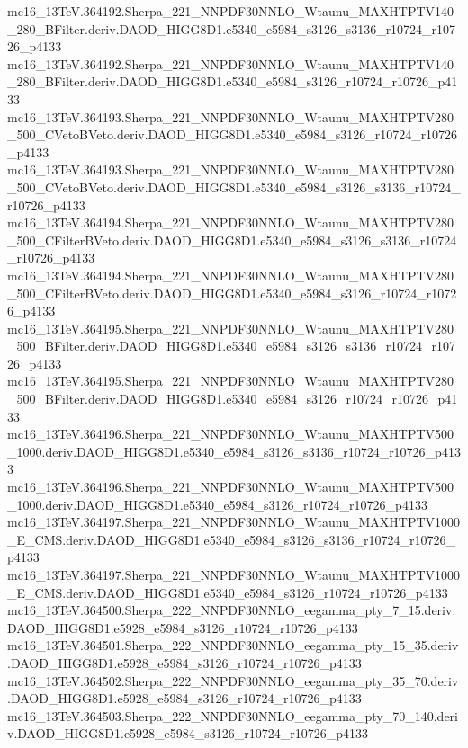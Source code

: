 mc16_13TeV.364192.Sherpa_221_NNPDF30NNLO_Wtaunu_MAXHTPTV140_280_BFilter.deriv.DAOD_HIGG8D1.e5340_e5984_s3126_s3136_r10724_r10726_p4133 \\
mc16_13TeV.364192.Sherpa_221_NNPDF30NNLO_Wtaunu_MAXHTPTV140_280_BFilter.deriv.DAOD_HIGG8D1.e5340_e5984_s3126_r10724_r10726_p4133 \\
mc16_13TeV.364193.Sherpa_221_NNPDF30NNLO_Wtaunu_MAXHTPTV280_500_CVetoBVeto.deriv.DAOD_HIGG8D1.e5340_e5984_s3126_r10724_r10726_p4133 \\
mc16_13TeV.364193.Sherpa_221_NNPDF30NNLO_Wtaunu_MAXHTPTV280_500_CVetoBVeto.deriv.DAOD_HIGG8D1.e5340_e5984_s3126_s3136_r10724_r10726_p4133 \\
mc16_13TeV.364194.Sherpa_221_NNPDF30NNLO_Wtaunu_MAXHTPTV280_500_CFilterBVeto.deriv.DAOD_HIGG8D1.e5340_e5984_s3126_s3136_r10724_r10726_p4133 \\
mc16_13TeV.364194.Sherpa_221_NNPDF30NNLO_Wtaunu_MAXHTPTV280_500_CFilterBVeto.deriv.DAOD_HIGG8D1.e5340_e5984_s3126_r10724_r10726_p4133 \\
mc16_13TeV.364195.Sherpa_221_NNPDF30NNLO_Wtaunu_MAXHTPTV280_500_BFilter.deriv.DAOD_HIGG8D1.e5340_e5984_s3126_s3136_r10724_r10726_p4133 \\
mc16_13TeV.364195.Sherpa_221_NNPDF30NNLO_Wtaunu_MAXHTPTV280_500_BFilter.deriv.DAOD_HIGG8D1.e5340_e5984_s3126_r10724_r10726_p4133 \\
mc16_13TeV.364196.Sherpa_221_NNPDF30NNLO_Wtaunu_MAXHTPTV500_1000.deriv.DAOD_HIGG8D1.e5340_e5984_s3126_s3136_r10724_r10726_p4133 \\
mc16_13TeV.364196.Sherpa_221_NNPDF30NNLO_Wtaunu_MAXHTPTV500_1000.deriv.DAOD_HIGG8D1.e5340_e5984_s3126_r10724_r10726_p4133 \\
mc16_13TeV.364197.Sherpa_221_NNPDF30NNLO_Wtaunu_MAXHTPTV1000_E_CMS.deriv.DAOD_HIGG8D1.e5340_e5984_s3126_s3136_r10724_r10726_p4133 \\
mc16_13TeV.364197.Sherpa_221_NNPDF30NNLO_Wtaunu_MAXHTPTV1000_E_CMS.deriv.DAOD_HIGG8D1.e5340_e5984_s3126_r10724_r10726_p4133 \\
mc16_13TeV.364500.Sherpa_222_NNPDF30NNLO_eegamma_pty_7_15.deriv.DAOD_HIGG8D1.e5928_e5984_s3126_r10724_r10726_p4133 \\
mc16_13TeV.364501.Sherpa_222_NNPDF30NNLO_eegamma_pty_15_35.deriv.DAOD_HIGG8D1.e5928_e5984_s3126_r10724_r10726_p4133 \\
mc16_13TeV.364502.Sherpa_222_NNPDF30NNLO_eegamma_pty_35_70.deriv.DAOD_HIGG8D1.e5928_e5984_s3126_r10724_r10726_p4133 \\
mc16_13TeV.364503.Sherpa_222_NNPDF30NNLO_eegamma_pty_70_140.deriv.DAOD_HIGG8D1.e5928_e5984_s3126_r10724_r10726_p4133 \\
